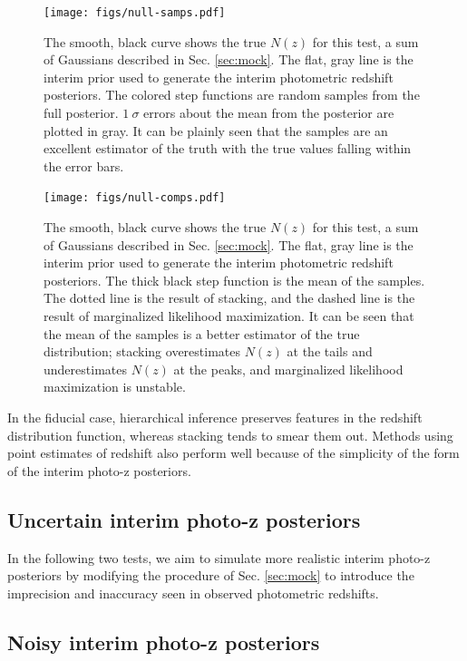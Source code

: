 \documentclass[preprint]{aastex}
\begin{document}
\begin{figure}
\texttt{[image: figs/null-samps.pdf]}
\caption{The smooth, black curve shows the true $N(z)$ for this test, a sum of 
Gaussians described in Sec. \ref{sec:mock}.  The flat, gray line is the interim 
prior used to generate the interim photometric redshift posteriors.  The 
colored step functions are random samples from the full posterior.  $1\ \sigma$ 
errors about the mean from the posterior are plotted in gray.  It can be 
plainly seen that the samples are an excellent estimator of the truth with the 
true values falling within the error bars.}
\label{fig:null-samp}
\end{figure}

\begin{figure}
\texttt{[image: figs/null-comps.pdf]}
\caption{The smooth, black curve shows the true $N(z)$ for this test, a sum of 
Gaussians described in Sec. \ref{sec:mock}.  The flat, gray line is the interim 
prior used to generate the interim photometric redshift posteriors.  The thick 
black step function is the mean of the samples.  The dotted line is the result 
of stacking, and the dashed line is the result of marginalized likelihood 
maximization.  It can be seen that the mean of the samples is a better 
estimator of the true distribution; stacking overestimates $N(z)$ at the tails 
and underestimates $N(z)$ at the peaks, and marginalized likelihood 
maximization is unstable.}
\label{fig:null-comp}
\end{figure}

In the fiducial case, hierarchical inference preserves features in the redshift 
distribution function, whereas stacking tends to smear them out.  Methods using 
point estimates of redshift also perform well because of the simplicity of the 
form of the interim photo-z posteriors.

\clearpage
\subsection{Uncertain interim photo-z posteriors}
\label{sec:unc}

In the following two tests, we aim to simulate more realistic interim photo-z 
posteriors by modifying the procedure of Sec. \ref{sec:mock} to introduce the 
imprecision and inaccuracy seen in observed photometric redshifts.

\subsection{Noisy interim photo-z posteriors}
\label{sec:noisy}
\end{document}
